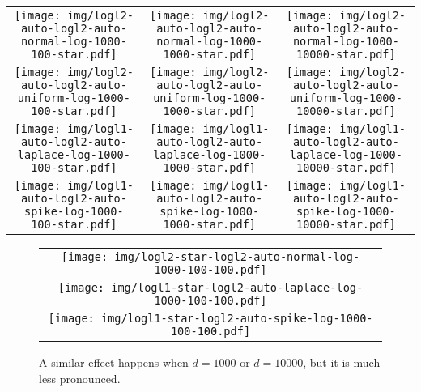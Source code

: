 \documentclass[twoside]{article}
\begin{document}
\begin{figure*}[t]
\begin{tabular}{ccc}
  \texttt{[image: img/logl2-auto-logl2-auto-normal-log-1000-100-star.pdf]}
& \texttt{[image: img/logl2-auto-logl2-auto-normal-log-1000-1000-star.pdf]}
& \texttt{[image: img/logl2-auto-logl2-auto-normal-log-1000-10000-star.pdf]}
\\
  \texttt{[image: img/logl2-auto-logl2-auto-uniform-log-1000-100-star.pdf]}
& \texttt{[image: img/logl2-auto-logl2-auto-uniform-log-1000-1000-star.pdf]}
& \texttt{[image: img/logl2-auto-logl2-auto-uniform-log-1000-10000-star.pdf]}
\\
  \texttt{[image: img/logl1-auto-logl2-auto-laplace-log-1000-100-star.pdf]}
& \texttt{[image: img/logl1-auto-logl2-auto-laplace-log-1000-1000-star.pdf]}
& \texttt{[image: img/logl1-auto-logl2-auto-laplace-log-1000-10000-star.pdf]}
\\
  \texttt{[image: img/logl1-auto-logl2-auto-spike-log-1000-100-star.pdf]}
& \texttt{[image: img/logl1-auto-logl2-auto-spike-log-1000-1000-star.pdf]}
& \texttt{[image: img/logl1-auto-logl2-auto-spike-log-1000-10000-star.pdf]}
\end{tabular}
\caption{}
\end{figure*}

\begin{figure}
\begin{tabular}{c}
\\ \texttt{[image: img/logl2-star-logl2-auto-normal-log-1000-100-100.pdf]}
\\ \texttt{[image: img/logl1-star-logl2-auto-laplace-log-1000-100-100.pdf]}
\\ \texttt{[image: img/logl1-star-logl2-auto-spike-log-1000-100-100.pdf]}
\end{tabular}
\caption{
    A similar effect happens when $d=1000$ or $d=10000$,
    but it is much less pronounced.
}
\end{figure}
\end{document}
